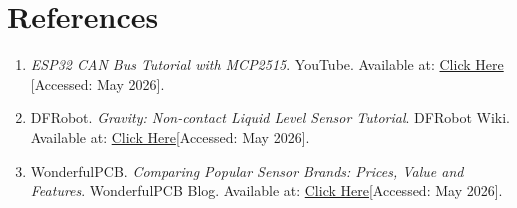 \documentclass[12pt,a4paper]{article}
\begin{document}
\newpage
\section*{References}

\begin{enumerate}
    \item \textit{ESP32 CAN Bus Tutorial with MCP2515}. YouTube. Available at: \href{https://www.youtube.com/watch?v=JZSCzRT9TTo&t=3s}{Click Here} [Accessed: May 2026].

    \item DFRobot. \textit{Gravity: Non-contact Liquid Level Sensor Tutorial}. DFRobot Wiki. Available at: \href{https://wiki.dfrobot.com/tutorial/20147/}{Click Here}[Accessed: May 2026].

    \item WonderfulPCB. \textit{Comparing Popular Sensor Brands: Prices, Value and Features}. WonderfulPCB Blog. Available at: \href{https://www.wonderfulpcb.com/blog/comparing-popular-sensor-brands-prices-value-features/}{Click Here}[Accessed: May 2026].
\end{enumerate}
\end{document}
